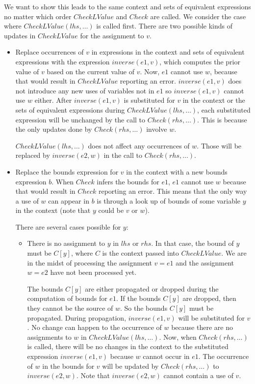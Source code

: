 We want to show this leads to the same context and sets of equivalent expressions no matter which order 
$CheckLValue$ and $Check$ are called.  We consider the case where  $CheckLValue(lhs, \ldots)$ 
is called first. There are two possible kinds of updates in $CheckLValue$ for the assignment to $v$.
\begin{itemize}
\item Replace occurrences of $v$ in expressions in the context and sets of equivalent expressions with the
expression $inverse(e1, v)$, which computes the prior value of $v$ based on the current value of $v$. 
Now, $e1$ cannot use $w$, because that would result in $CheckLValue$ reporting an error.  
$inverse(e1, v)$ does 
not introduce any new uses of variables not in $e1$ so $inverse(e1, v)$ cannot use $w$ either.   
After $inverse(e1, v)$ is substituted for $v$ in the context
or the sets of equivalent expressions during $CheckLValue(lhs, \ldots)$, each substituted expression will be
unchanged by the call to $Check(rhs, \ldots)$.  This is because the only updates done by 
$Check(rhs, \ldots)$ involve $w$.   

$CheckLValue(lhs, \ldots)$ does not affect any occurrences of $w$.  Those will be replaced 
by $inverse(e2, w)$ in the call to $Check(rhs, \ldots)$.

\item Replace the bounds expression for $v$ in the context with a new bounds expression $b$.
When $Check$ infers the bounds for $e1$, $e1$ cannot use $w$ because that would result in 
$Check$ reporting an error. This means that the only way a use of $w$ can appear in $b$ is
through a look up of bounds of some variable $y$ in the context (note that $y$ could be
$v$ or $w$).

There are several cases possible for $y$:
\begin{itemize}
\item There is no assignment to $y$ in $lhs$ or $rhs$.   In that case, the bound of $y$
must be $C[y]$, where $C$ is the context passed into $CheckLValue$.  We are in the midst
of processing the assignment $v = e1$ and the assignment $w = e2$ have not been processed yet.  

The bounds $C[y]$ are  either propagated or dropped during the computation of bounds for $e1$.
If the bounds $C[y]$ are dropped, then they cannot be the source of $w$.  So the bounds $C[y]$ must be propagated.  During propagation, $inverse(e1, v)$ will be substituted for $v$.  No change can happen to the occurrence of $w$ because there are no assignments to $w$
in $CheckLValue(lhs, \ldots)$.  Now, when $Check(rhs, \ldots)$ is called, there will be no changes in the
context to the substituted expression $inverse(e1, v)$ because $w$ cannot occur in $e1$.  
The occurrence of $w$ in the bounds for $v$ will be updated by $Check(rhs, \ldots)$ to $inverse(e2, w)$.
Note that $inverse(e2, w)$ cannot contain a use of $v$.


\end{itemize}
\end{itemize}
